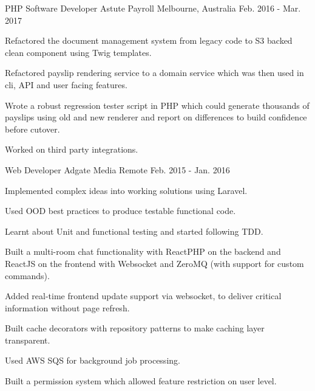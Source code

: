 \begin{cventries}
{\begin{cvitems}
      \end{cvitems}
    }
  \cventry
    {PHP Software Developer} %
    {Astute Payroll} %
    {Melbourne, Australia} %
    {Feb. 2016 - Mar. 2017} %
    {
      \begin{cvitems} %
        \item {Refactored the document management system from legacy code to S3 backed clean component using Twig templates.}
        \item {Refactored payslip rendering service to a domain service which was then used in cli, API and user facing features.}
        \item {Wrote a robust regression tester script in PHP which could generate thousands of payslips using old and new renderer and report on differences to build confidence before cutover.}
        \item {Worked on third party integrations.}
      \end{cvitems}
    }

  \cventry
    {Web Developer} %
    {Adgate Media} %
    {Remote} %
    {Feb. 2015 - Jan. 2016} %
    {
      \begin{cvitems} %
        \item {Implemented complex ideas into working solutions using Laravel.}
        \item {Used OOD best practices to produce testable functional code.}
        \item {Learnt about Unit and functional testing and started following TDD.}
        \item {Built a multi-room chat functionality with ReactPHP on the backend and ReactJS on the frontend with Websocket and ZeroMQ (with support for custom commands).}
        \item {Added real-time frontend update support via websocket, to deliver critical information without page refresh.}
        \item {Built cache decorators with repository patterns to make caching layer transparent.}
        \item {Used AWS SQS for background job processing.}
        \item {Built a permission system which allowed feature restriction on user level.}
      \end{cvitems}
    }


\end{cventries}
